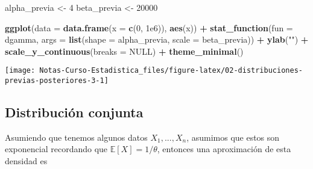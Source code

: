 \documentclass[
  12pt,
]{book}
\newenvironment{Shaded}{\begin{snugshade}}{\end{snugshade}}
\newcommand{\DataTypeTok}[1]{\textcolor[rgb]{0.13,0.29,0.53}{#1}}
\newcommand{\DecValTok}[1]{\textcolor[rgb]{0.00,0.00,0.81}{#1}}
\newcommand{\FloatTok}[1]{\textcolor[rgb]{0.00,0.00,0.81}{#1}}
\newcommand{\KeywordTok}[1]{\textcolor[rgb]{0.13,0.29,0.53}{\textbf{#1}}}
\newcommand{\NormalTok}[1]{#1}
\newcommand{\OperatorTok}[1]{\textcolor[rgb]{0.81,0.36,0.00}{\textbf{#1}}}
\newcommand{\OtherTok}[1]{\textcolor[rgb]{0.56,0.35,0.01}{#1}}
\newcommand{\StringTok}[1]{\textcolor[rgb]{0.31,0.60,0.02}{#1}}
\begin{document}
\begin{Shaded}
\begin{Highlighting}[]
\NormalTok{alpha\_previa \textless{}{-}}\StringTok{ }\DecValTok{4}
\NormalTok{beta\_previa \textless{}{-}}\StringTok{ }\DecValTok{20000}

\KeywordTok{ggplot}\NormalTok{(}\DataTypeTok{data =} \KeywordTok{data.frame}\NormalTok{(}\DataTypeTok{x =} \KeywordTok{c}\NormalTok{(}\DecValTok{0}\NormalTok{, }\FloatTok{1e6}\NormalTok{)), }\KeywordTok{aes}\NormalTok{(x)) }\OperatorTok{+}
\StringTok{  }\KeywordTok{stat\_function}\NormalTok{(}\DataTypeTok{fun =}\NormalTok{ dgamma, }\DataTypeTok{args =} \KeywordTok{list}\NormalTok{(}\DataTypeTok{shape =}\NormalTok{ alpha\_previa, }\DataTypeTok{scale =}\NormalTok{ beta\_previa)) }\OperatorTok{+}
\StringTok{  }\KeywordTok{ylab}\NormalTok{(}\StringTok{""}\NormalTok{) }\OperatorTok{+}
\StringTok{  }\KeywordTok{scale\_y\_continuous}\NormalTok{(}\DataTypeTok{breaks =} \OtherTok{NULL}\NormalTok{) }\OperatorTok{+}
\StringTok{  }\KeywordTok{theme\_minimal}\NormalTok{()}
\end{Highlighting}
\end{Shaded}

\begin{center}\texttt{[image: Notas-Curso-Estadistica\_files/figure-latex/02-distribuciones-previas-posteriores-3-1]} \end{center}

\hypertarget{distribuciuxf3n-conjunta}{%
\subsection{Distribución conjunta}\label{distribuciuxf3n-conjunta}}

Asumiendo que tenemos algunos datos \(X_1, ..., X_n\), asumimos que estos son exponencial recordando que \(\mathbb E [X] = 1/\theta\), entonces una aproximación de esta densidad es
\end{document}
